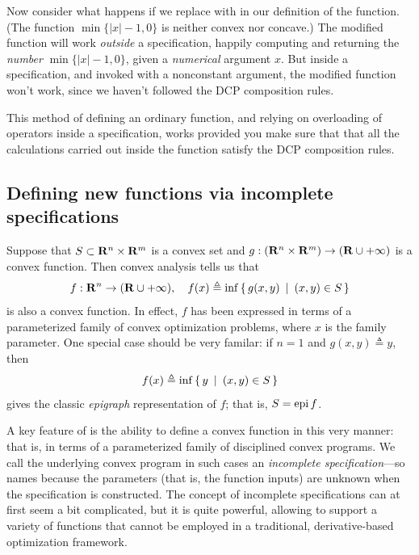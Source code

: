 \documentclass[12pt]{article}
\begin{document}
Now consider what happens if we replace \verb@max@ with \verb@min@
in our definition of the \verb@deadzone@ function.
(The function $\min \{ |x|-1, 0 \}$ is neither convex nor concave.)
The modified function will work \emph{outside}
a \cvx specification, happily computing and returning 
the \emph{number} $\min \{|x|-1,0\}$, given a \emph{numerical}
argument $x$.
But inside a \cvx specification, and invoked 
with a nonconstant argument,
the modified function won't work,
since we haven't followed the DCP composition rules.

This method of defining an ordinary function, and relying on
overloading of operators inside a \cvx specification,
works provided you make sure that that all the 
calculations carried out inside
the function satisfy the DCP composition rules.

\subsection{Defining new functions via incomplete specifications}

Suppose that $S\subset\R^n\times\R^m$ is a convex set and 
$g:(\R^n\times\R^m)\rightarrow(\R\cup+\infty)$ is a convex function.
Then convex analysis tells us that
\begin{equation}
	\label{eq:partial}
	f:\R^n\rightarrow(\R\cup+\infty), \quad f(x) \triangleq \inf\Condset{g(x,y)}{(x,y)\in S }
\end{equation}
is also a convex function. In effect, $f$
has been expressed in terms of a parameterized 
family of convex optimization problems, where $x$ is
the family parameter.
One special case should be very familar: if $n=1$ and
$g(x,y)\triangleq y$, then
\begin{equation}
	f(x) \triangleq \inf\left\{\,y\,~|~\,(x,y)\in S\,\right\}
\end{equation}
gives the classic \emph{epigraph} representation of $f$; that is, $S=\operatorname{epi} f$.

A key feature of \cvx is the ability to define a convex
function in this very manner: that is, in terms of a 
parameterized family of disciplined convex programs. 
We call the underlying convex program in such cases
an \emph{incomplete specification}---so names because
the parameters (that is, the function inputs)
are unknown when the specification is
constructed. The concept of incomplete 
specifications can at first seem a bit complicated,
but it is quite powerful, allowing
\cvx to support a variety of functions that cannot be
employed in a traditional, derivative-based optimization framework.
\end{document}
